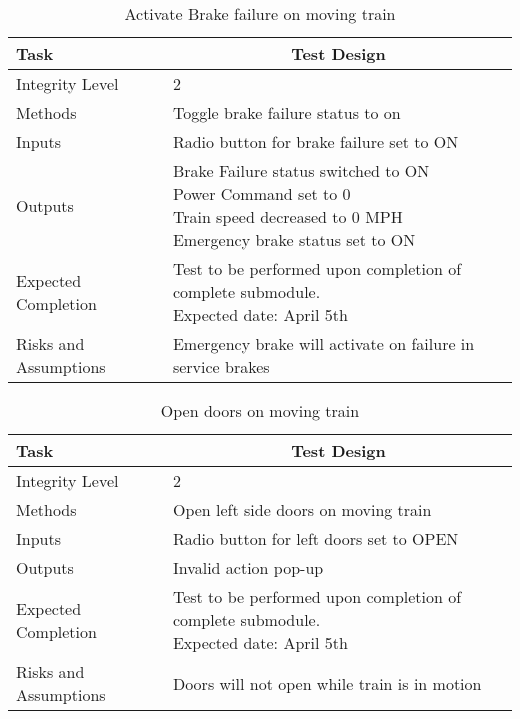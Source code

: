 \documentclass[]{article}
\begin{document}
	\begin{table}[H]
		\centering
		\caption{Activate Brake failure on moving train}
		\begin{tabular}{|l|l|}
			\hline
			Task & \multicolumn{1}{c|}{Test Design} \\ \hline
			Integrity Level & 2 \\ \hline
			Methods & Toggle brake failure status to on  \\ \hline
			Inputs &  Radio button for brake failure set to ON \\ \hline
			Outputs & \parbox[t]{10cm}{ Brake Failure status switched to ON\\ Power Command set to 0\\ Train speed decreased to 0 MPH\\ Emergency brake status set to ON  }\\ \hline
			Expected Completion & \parbox[t]{10cm}{Test to be performed upon completion of complete submodule.\\ Expected date: April 5th}\\ \hline
			Risks and Assumptions & Emergency brake will activate on failure in service brakes\\ \hline
		\end{tabular}
	\end{table}

	\begin{table}[H]
		\centering
		\caption{Open doors on moving train}
		\begin{tabular}{|l|l|}
			\hline
			Task & \multicolumn{1}{c|}{Test Design} \\ \hline
			Integrity Level & 2 \\ \hline
			Methods & Open left side doors on moving train  \\ \hline
			Inputs &  Radio button for left doors set to OPEN \\ \hline
			Outputs & Invalid action pop-up\\ \hline
			Expected Completion & \parbox[t]{10cm}{Test to be performed upon completion of complete submodule.\\ Expected date: April 5th}\\ \hline
			Risks and Assumptions & Doors will not open while train is in motion\\ \hline
		\end{tabular}
	\end{table}
\end{document}
